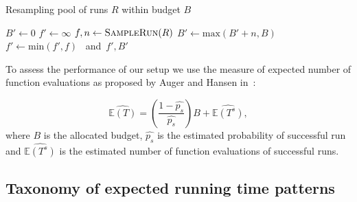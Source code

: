 \documentclass{sig-alternate}
\begin{document}

\begin{algorithm}
\caption{Resampling pool of runs $R$ within budget $B$}
\label{alg:resample}
\begin{algorithmic}[1]
    \State $B' \gets 0$
    \State $f' \gets \infty$
    \Do
        \State $f, n \gets \Call{SampleRun}{R}$%
        \State $B' \gets \mbox{max}(B' + n, B)$
        \State $f' \gets \mbox{min}(f', f)$
    \EndFunction \mbox{ and }\Return $f', B'$
\end{algorithmic}
\end{algorithm}

To assess the performance of our setup we use the measure of expected number of function evaluations as proposed by Auger and Hansen in~\cite{Hansen05performanceevaluation}:

\begin{equation}
    \widehat{\mathbb{E}(T)} = \left(\dfrac{1 - \widehat{p_s}}{\widehat{p_s}}\right) B + \widehat{\mathbb{E}(T^s)},
    \label{eq:ert}
\end{equation}
where $B$ is the allocated budget, $\widehat{p_s}$ is the estimated probability of successful run and $\widehat{\mathbb{E}(T^s)}$ is the estimated number of function evaluations of successful runs.


\subsection{Taxonomy of expected running time patterns}
\end{document}
